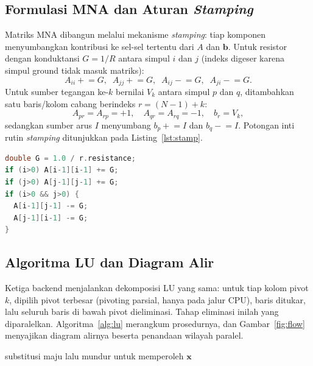 \documentclass[conference]{IEEEtran}
\begin{document}
\subsection{Formulasi MNA dan Aturan \emph{Stamping}}
Matriks MNA dibangun melalui mekanisme \emph{stamping}: tiap komponen menyumbangkan kontribusi ke sel-sel tertentu dari $A$ dan $\mathbf{b}$. Untuk resistor dengan konduktansi $G=1/R$ antara simpul $i$ dan $j$ (indeks digeser karena simpul ground tidak masuk matriks):
\begin{equation}
A_{ii}\!\mathrel{+}=\!G,\;\; A_{jj}\!\mathrel{+}=\!G,\;\; A_{ij}\!\mathrel{-}=\!G,\;\; A_{ji}\!\mathrel{-}=\!G.
\end{equation}
Untuk sumber tegangan ke-$k$ bernilai $V_k$ antara simpul $p$ dan $q$, ditambahkan satu baris/kolom cabang berindeks $r=(N-1)+k$:
\begin{equation}
A_{pr}=A_{rp}=+1,\quad A_{qr}=A_{rq}=-1,\quad b_r=V_k,
\end{equation}
sedangkan sumber arus $I$ menyumbang $b_p\mathrel{+}=I$ dan $b_q\mathrel{-}=I$. Potongan inti rutin \emph{stamping} ditunjukkan pada Listing~\ref{lst:stamp}.

\begin{lstlisting}[language=C++,caption={Inti rutin stamping MNA (\texttt{mna.cpp}).},label={lst:stamp}]
double G = 1.0 / r.resistance;
if (i>0) A[i-1][i-1] += G;
if (j>0) A[j-1][j-1] += G;
if (i>0 && j>0) {
  A[i-1][j-1] -= G;
  A[j-1][i-1] -= G;
}
\end{lstlisting}

\subsection{Algoritma LU dan Diagram Alir}
Ketiga backend menjalankan dekomposisi LU yang sama: untuk tiap kolom pivot $k$, dipilih pivot terbesar (pivoting parsial, hanya pada jalur CPU), baris ditukar, lalu seluruh baris di bawah pivot dieliminasi. Tahap eliminasi inilah yang diparalelkan. Algoritma~\ref{alg:lu} merangkum prosedurnya, dan Gambar~\ref{fig:flow} menyajikan diagram alirnya beserta penandaan wilayah paralel.

\begin{algorithm}[t]
\caption{Dekomposisi LU dengan pivoting parsial}
\label{alg:lu}
substitusi maju lalu mundur untuk memperoleh $\mathbf{x}$\;
\end{algorithm}
\end{document}
